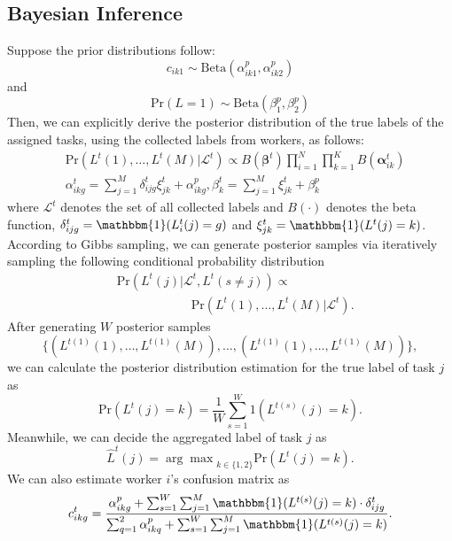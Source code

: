 \documentclass[letterpaper]{article} %
\begin{document}
\subsection{Bayesian Inference} Suppose the prior distributions follow: $$c_{ik1}\sim \textrm{Beta}(\alpha^{p}_{ik1},\alpha^{p}_{ik2})$$ and $$\textrm{Pr}(L=1)\sim \textrm{Beta}(\beta^{p}_{1},\beta^{p}_{2})$$ Then, we can explicitly derive the posterior distribution of the true labels of the assigned tasks, using the collected labels from workers, as follows:
\begin{align}
&\textrm{Pr}\left(L^{t}(1),\ldots, L^{t}(M)|\mathcal{L}^{t}\right)\propto B(\bm{\beta}^{t}){\prod}_{i=1}^{N}{\prod}_{k=1}^{K} B(\bm{\alpha}^{t}_{ik}) \nonumber \\
&\alpha^{t}_{ikg}={\sum}_{j=1}^{M}\delta^{t}_{ijg}\xi^{t}_{jk}+\alpha^{p}_{ikg}, \beta^{t}_k={\sum}_{j=1}^{M}\xi^{t}_{jk}+\beta^{p}_{k} \label{PostDist}
\end{align}
where $\mathcal{L}^{t}$ denotes the set of all collected labels and $B(\cdot)$ denotes the beta function, $\delta^{t}_{ijg}=\mathbbm{1}(L^t_i(j)=g)$ and $\xi^{t}_{jk}= \mathbbm{1}(L^{t}(j)=k)$. According to Gibbs sampling, we can generate posterior samples via iteratively sampling the following conditional probability distribution
\begin{equation}
\begin{split}
&\textrm{Pr}\left(L^{t}(j)|\mathcal{L}^{t},L^t (s\neq j)\right)\propto\\ &\qquad\qquad\qquad\textrm{Pr}\left(L^{t}(1),\ldots, L^{t}(M)|\mathcal{L}^{t}\right).
\end{split}
\end{equation}
After generating $W$ posterior samples
\begin{equation*}
\{(L^{t(1)}(1),\ldots, L^{t(1)}(M)),\ldots, (L^{t(1)}(1),\ldots, L^{t(1)}(M))\},
\end{equation*}
we can calculate the posterior distribution estimation for the true label of task $j$ as
\begin{equation}
\textrm{Pr}\left(L^{t}(j)=k\right)=\frac{1}{W}{\sum}_{s=1}^{W}1\left(L^{t(s)}(j)=k\right).
\end{equation}
Meanwhile, we can decide the aggregated label of task $j$ as
\begin{equation}
\hat{L}^{t}(j)={\arg\max}_{k\in\{1,2\}}\textrm{Pr}(L^{t}(j)=k).
\end{equation}
We can also estimate worker $i$'s confusion matrix as
\begin{equation}
c^{t}_{ikg}=\frac{\alpha_{ikg}^{p}+\sum_{s=1}^{W}\sum_{j=1}^{M}\mathbbm{1}(L^{t(s)}(j)=k)\cdot \delta^{t}_{ijg}}{\sum_{q=1}^2\alpha_{ikq}^{p}+\sum_{s=1}^{W}\sum_{j=1}^{M}\mathbbm{1}(L^{t(s)}(j)=k)}.
\end{equation}
\end{document}
